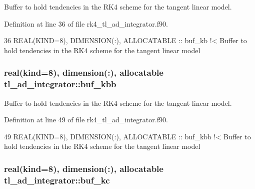 Buffer to hold tendencies in the R\+K4 scheme for the tangent linear model. 



Definition at line 36 of file rk4\+\_\+tl\+\_\+ad\+\_\+integrator.\+f90.


\begin{DoxyCode}
36   \textcolor{keywordtype}{REAL(KIND=8)}, \textcolor{keywordtype}{DIMENSION(:)}, \textcolor{keywordtype}{ALLOCATABLE} :: buf\_kb\textcolor{comment}{ !< Buffer to hold tendencies in the RK4 scheme for the
       tangent linear model}
\end{DoxyCode}
\subsubsection[{\texorpdfstring{buf\+\_\+kbb}{buf_kbb}}]{\setlength{\rightskip}{0pt plus 5cm}real(kind=8), dimension(\+:), allocatable tl\+\_\+ad\+\_\+integrator\+::buf\+\_\+kbb\hspace{0.3cm}{\ttfamily [private]}}\hypertarget{namespacetl__ad__integrator_a68ad95731421a7e0c9f37668631e279c}{}\label{namespacetl__ad__integrator_a68ad95731421a7e0c9f37668631e279c}


Buffer to hold tendencies in the R\+K4 scheme for the tangent linear model. 



Definition at line 49 of file rk4\+\_\+tl\+\_\+ad\+\_\+integrator.\+f90.


\begin{DoxyCode}
49   \textcolor{keywordtype}{REAL(KIND=8)}, \textcolor{keywordtype}{DIMENSION(:)}, \textcolor{keywordtype}{ALLOCATABLE} :: buf\_kbb\textcolor{comment}{ !< Buffer to hold tendencies in the RK4 scheme for the
       tangent linear model}
\end{DoxyCode}
\subsubsection[{\texorpdfstring{buf\+\_\+kc}{buf_kc}}]{\setlength{\rightskip}{0pt plus 5cm}real(kind=8), dimension(\+:), allocatable tl\+\_\+ad\+\_\+integrator\+::buf\+\_\+kc\hspace{0.3cm}{\ttfamily [private]}}\hypertarget{namespacetl__ad__integrator_a1cf59efa7229b47e580202dfe4bd4fd6}{}\label{namespacetl__ad__integrator_a1cf59efa7229b47e580202dfe4bd4fd6}


